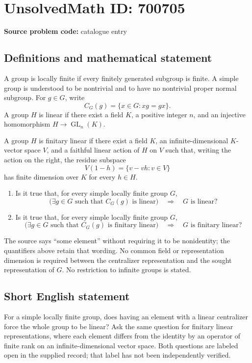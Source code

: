 \documentclass[11pt]{article}
\begin{document}
\section*{UnsolvedMath ID: 700705}
\textbf{Source problem code:} catalogue entry
\subsection{Definitions and mathematical statement}
A group is locally finite if every finitely generated subgroup is finite. A simple group is understood to be nontrivial and to have no nontrivial proper normal subgroup. For \(g\in G\), write
\[
C_G(g)=\{x\in G:xg=gx\}.
\]
A group \(H\) is linear if there exist a field \(K\), a positive integer \(n\), and an injective homomorphism \(H\to\operatorname{GL}_n(K)\).

A group \(H\) is finitary linear if there exist a field \(K\), an infinite-dimensional \(K\)-vector space \(V\), and a faithful linear action of \(H\) on \(V\) such that, writing the action on the right, the residue subspace
\[
V(1-h)=\{v-vh:v\in V\}
\]
has finite dimension over \(K\) for every \(h\in H\).

\begin{enumerate}
\item[(a)] Is it true that, for every simple locally finite group \(G\),
\[
\bigl(\exists g\in G\text{ such that }C_G(g)\text{ is linear}\bigr)
\quad\Longrightarrow\quad G\text{ is linear}?
\]
\item[(b)] Is it true that, for every simple locally finite group \(G\),
\[
\bigl(\exists g\in G\text{ such that }C_G(g)\text{ is finitary linear}\bigr)
\quad\Longrightarrow\quad G\text{ is finitary linear}?
\]
\end{enumerate}
The source says ``some element'' without requiring it to be nonidentity; the quantifiers above retain that wording. No common field or representation dimension is required between the centralizer representation and the sought representation of \(G\). No restriction to infinite groups is stated.
\subsection{Short English statement}
For a simple locally finite group, does having an element with a linear centralizer force the whole group to be linear? Ask the same question for finitary linear representations, where each element differs from the identity by an operator of finite rank on an infinite-dimensional vector space. Both questions are labeled open in the supplied record; that label has not been independently verified.
\end{document}
